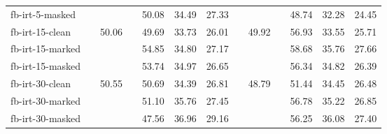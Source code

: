\begin{tabular}{ l c r c r r r c r c r r r }
    fb-irt-5-masked    &&       && 50.08 & 34.49 & 27.33 &&       && 48.74 & 32.28 & 24.45 \\ \addlinespace
    fb-irt-15-clean    && 50.06 && 49.69 & 33.73 & 26.01 && 49.92 && 56.93 & 33.55 & 25.71 \\
    fb-irt-15-marked   &&       && 54.85 & 34.80 & 27.17 &&       && 58.68 & 35.76 & 27.66 \\
    fb-irt-15-masked   &&       && 53.74 & 34.97 & 26.65 &&       && 56.34 & 34.82 & 26.39 \\ \addlinespace
    fb-irt-30-clean    && 50.55 && 50.69 & 34.39 & 26.81 && 48.79 && 51.44 & 34.45 & 26.48 \\
    fb-irt-30-marked   &&       && 51.10 & 35.76 & 27.45 &&       && 56.78 & 35.22 & 26.85 \\
    fb-irt-30-masked   &&       && 47.56 & 36.96 & 29.16 &&       && 56.25 & 36.08 & 27.40 \\ \bottomrule

\end{tabular}
